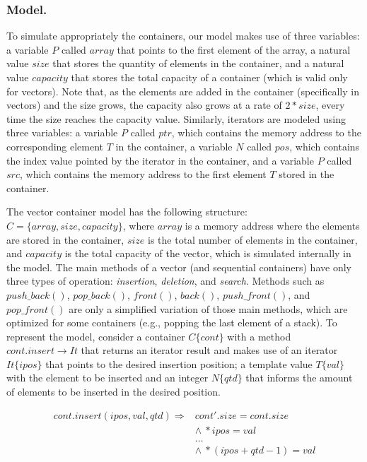 \documentclass[a4paper]{llncs}
\begin{document}
\subsubsection{Model.}

To simulate appropriately the containers, our model makes
use of three variables: a variable $P$ called $array$ that points
to the first element of the array, a natural value $size$ that stores
the quantity of elements in the container, and a natural value $capacity$
that stores the total capacity of a container (which is valid only for vectors).
Note that, as the elements are added in the container (specifically in vectors)
and the size grows, the capacity also grows at a rate of $2*size$, every time
the size reaches the capacity value. Similarly, iterators are modeled using
three variables: a variable $P$ called $ptr$, which contains the memory address
to the corresponding element $T$ in the container, a variable $N$ called $pos$,
which contains the index value pointed by the iterator in the container, and a
variable $P$ called $src$, which contains the memory address to the first
element $T$ stored in the container.

The vector container model has the following structure:
$C = \{ array, size, capacity\}$,
where $array$ is a memory address where the elements are stored in the container,
$size$ is the total number of elements in the container, and $capacity$
is the total capacity of the vector, which is simulated internally in the model.
The main methods of a vector (and sequential containers) have only
three types of operation: \textit{insertion}, \textit{deletion}, and \textit{search}.
Methods such as $push\_back\left(\right)$, $pop\_back\left(\right)$, $front\left(\right)$,
$back\left(\right)$, $push\_front\left(\right)$, and $pop\_front\left(\right)$ are only
a simplified variation of those main methods, which are optimized for some containers
(e.g., popping the last element of a stack).
%
To represent the model, consider a container $C\{cont\}$ with a method
$cont.insert \rightarrow It$ that returns an iterator result and
makes use of an iterator $It\{ipos\}$ that points to the desired
insertion position; a template value $T\{val\}$ with the element
to be inserted and an integer $N\{qtd\}$ that informs the amount
of elements to be inserted in the desired position.

\[\begin{array}{ll}
cont.insert(ipos, val, qtd) \Longrightarrow & cont'.size = cont.size \\
  & \wedge \: *ipos = val \\
  & \ldots \\
  & \wedge \: *(ipos + qtd - 1) = val \\
\end{array}\]
\end{document}
